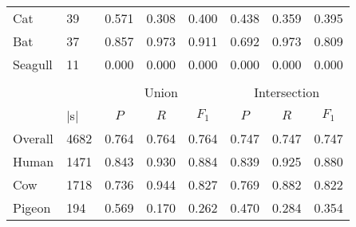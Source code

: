 \begin{table}[t]
\begin{tabular}{llllllll}
\multicolumn{1}{|l|}{Cat}         & \multicolumn{1}{l|}{39}           & 0.571                   & 0.308                   & \multicolumn{1}{l|}{0.400} & 0.438                   & 0.359                   & \multicolumn{1}{l|}{0.395} \\
\multicolumn{1}{|l|}{Bat}         & \multicolumn{1}{l|}{37}           & 0.857                   & 0.973                   & \multicolumn{1}{l|}{0.911} & 0.692                   & 0.973                   & \multicolumn{1}{l|}{0.809} \\
\multicolumn{1}{|l|}{Seagull}     & \multicolumn{1}{l|}{11}           & 0.000                   & 0.000                   & \multicolumn{1}{l|}{0.000} & 0.000                   & 0.000                   & \multicolumn{1}{l|}{0.000} \\ \hline
                                  &                                   &                         &                         &                            &                         &                         &                            \\ \cline{3-8} 
                                  & \multicolumn{1}{l|}{}             & \multicolumn{3}{c|}{Union}                                                     & \multicolumn{3}{c|}{Intersection}                                              \\ \hline
\multicolumn{1}{|l|}{\Spec{}} & \multicolumn{1}{l|}{$|$\Isol{}s$|$} & \multicolumn{1}{c}{$P$} & \multicolumn{1}{c}{$R$} & \multicolumn{1}{c|}{$F_1$} & \multicolumn{1}{c}{$P$} & \multicolumn{1}{c}{$R$} & \multicolumn{1}{c|}{$F_1$} \\ \hline
\multicolumn{1}{|l|}{Overall}     & \multicolumn{1}{l|}{4682}         & 0.764                   & 0.764                   & \multicolumn{1}{l|}{0.764} & 0.747                   & 0.747                   & \multicolumn{1}{l|}{0.747} \\
\multicolumn{1}{|l|}{Human}       & \multicolumn{1}{l|}{1471}         & 0.843                   & 0.930                   & \multicolumn{1}{l|}{0.884} & 0.839                   & 0.925                   & \multicolumn{1}{l|}{0.880} \\
\multicolumn{1}{|l|}{Cow}         & \multicolumn{1}{l|}{1718}         & 0.736                   & 0.944                   & \multicolumn{1}{l|}{0.827} & 0.769                   & 0.882                   & \multicolumn{1}{l|}{0.822} \\
\multicolumn{1}{|l|}{Pigeon}      & \multicolumn{1}{l|}{194}          & 0.569                   & 0.170                   & \multicolumn{1}{l|}{0.262} & 0.470                   & 0.284                   & \multicolumn{1}{l|}{0.354} \\

\end{tabular}
\end{table}
